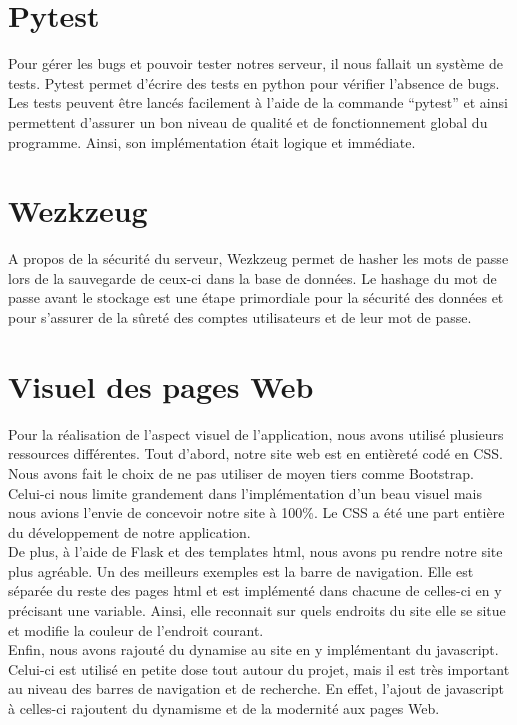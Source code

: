 \documentclass[12pt,titlepage]{report}
\begin{document}
\section{Pytest}

Pour gérer les bugs et pouvoir tester notres serveur, il nous fallait un système de tests. Pytest permet d’écrire des tests en python pour vérifier l’absence de bugs. Les tests peuvent être lancés facilement à l’aide de la commande “pytest” et ainsi permettent d’assurer un bon niveau de qualité et de fonctionnement global du programme. Ainsi, son implémentation était logique et immédiate.

\section{Wezkzeug}

A propos de la sécurité du serveur, Wezkzeug permet de hasher les mots de passe lors de la sauvegarde de ceux-ci dans la base de données. Le hashage du mot de passe avant le stockage est une étape primordiale pour la sécurité des données et pour s’assurer de la sûreté des comptes utilisateurs et de leur mot de passe.

\section{Visuel des pages Web}
Pour la réalisation de l’aspect visuel de l’application, nous avons utilisé plusieurs ressources différentes. Tout d’abord, notre site web est en entièreté codé en CSS. Nous avons fait le choix de ne pas utiliser de moyen tiers comme Bootstrap. Celui-ci nous limite grandement dans l’implémentation d’un beau visuel mais nous avions l’envie de concevoir notre site à 100\%. Le CSS a été une part entière du développement de notre application. \\

De plus, à l’aide de Flask et des templates html, nous avons pu rendre notre site plus agréable. Un des meilleurs exemples est la barre de navigation. Elle est séparée du reste des pages html et est implémenté dans chacune de celles-ci en y précisant une variable. Ainsi, elle reconnait sur quels endroits du site elle se situe et modifie la couleur de l’endroit courant. \\

Enfin, nous avons rajouté du dynamise au site en y implémentant du javascript. Celui-ci est utilisé en petite dose tout autour du projet, mais il est très important au niveau des barres de navigation et de recherche. En effet, l’ajout de javascript à celles-ci rajoutent du dynamisme et de la modernité aux pages Web. 
\end{document}
